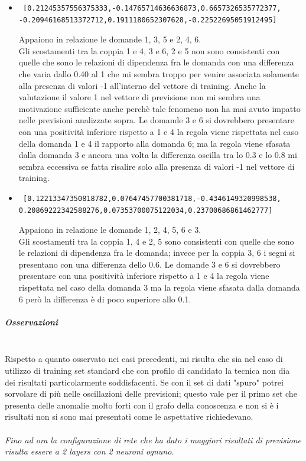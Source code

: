 \documentclass[10pt,a4paper]{article}
\begin{document}
\begin{itemize}
\item \begin{verbatim} [0.21245357556375333,-0.14765714636636873,0.6657326535772377,
-0.20946168513372712,0.1911180652307628,-0.22522695051912495]
\end{verbatim}
Appaiono in relazione le domande 1, 3, 5  e 2, 4, 6.\\
Gli scostamenti tra la coppia 1 e 4, 3 e 6, 2 e 5 non sono consistenti con quelle che sono le relazioni di dipendenza fra le domanda con una differenza che varia dallo 0.40 al 1 che mi sembra troppo per venire associata solamente alla presenza di valori -1 all'interno del vettore di training. Anche la valutazione il valore 1 nel vettore di previsione non mi sembra una motivazione sufficiente anche perch\`e tale fenomeno non ha mai avuto impatto nelle previsioni analizzate sopra.
Le domande 3 e 6 si dovrebbero presentare con una positivit\`a inferiore rispetto a 1 e 4 la regola viene rispettata nel caso della domanda 1 e 4 il rapporto alla domanda 6; ma la regola viene sfasata dalla domanda 3 e ancora una volta la differenza oscilla tra lo 0.3 e lo 0.8 mi sembra eccessiva se fatta risalire solo alla presenza di valori -1 nel vettore di training.


\item \begin{verbatim} [0.12213347350818782,0.07647457700381718,-0.4346149320998538,
0.20869222342588276,0.07353700075122034,0.23700686861462777]
\end{verbatim}
Appaiono in relazione le domande 1, 2, 4, 5, 6 e 3.\\
Gli scostamenti tra la coppia 1, 4 e 2, 5 sono consistenti con quelle che sono le relazioni di dipendenza fra le domanda; invece per la coppia 3, 6 i segni si presentano con una differenza dello 0.6.
Le domande 3 e 6 si dovrebbero presentare con una positivit\`a inferiore rispetto a 1 e 4 la regola viene rispettata nel caso della domanda 3 ma la regola viene sfasata dalla domanda 6 per\`o la differenza \`e di poco superiore allo 0.1.
\end{itemize}
\subparagraph{Osservazioni}\mbox{}
\label{Osservazioni su rete a 4 neuroni per 1 unico layers}
\\
Rispetto a quanto osservato nei casi precedenti, mi risulta che sia nel caso di utilizzo di training set standard che con profilo di candidato la tecnica non dia dei risultati particolarmente soddisfacenti. Se con il set di dati "spuro" potrei sorvolare di pi\`u nelle oscillazioni delle previsioni; questo vale per il primo set che presenta delle anomalie molto forti con il grafo della conoscenza e non si \`e i risultati non si sono mai presentati come le aspettative richiedevano.
\\\\
\textit{Fino ad ora la configurazione di rete che ha dato i maggiori risultati di previsione risulta essere a 2 layers con 2 neuroni ognuno.}
\end{document}
